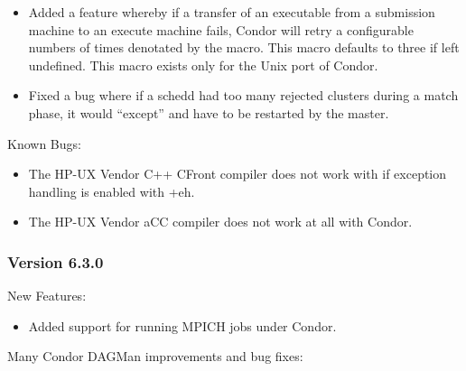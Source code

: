 \begin{itemize}
\item Added a feature whereby if a transfer of an executable
from a submission machine to an execute machine fails, Condor
will retry a configurable numbers of times denotated by the
 macro. This macro defaults to three if
left undefined. This macro exists only for the Unix port of Condor.

\item Fixed a bug where if a schedd had too many rejected clusters during a
match phase, it would ``except'' and have to be restarted by the master.

\end{itemize}

\noindent Known Bugs:
\begin{itemize}
\item The HP-UX Vendor C++ CFront compiler does not work with 
if exception handling is enabled with +eh.

\item The HP-UX Vendor aCC compiler does not work at all with Condor.
\end{itemize}

\subsubsection{\label{sec:New-6-3-0}Version 6.3.0}

\noindent New Features:
\begin{itemize}

\item Added support for running MPICH jobs under Condor.

\end{itemize}

\noindent
Many Condor DAGMan improvements and bug fixes:

